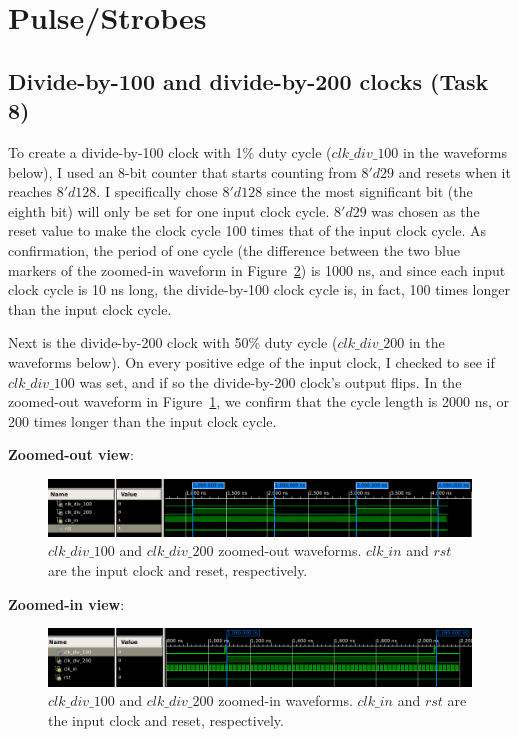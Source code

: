 \documentclass{article}
\begin{document}
\section{Pulse/Strobes}
\subsection{Divide-by-100 and divide-by-200 clocks (Task 8)}
To create a divide-by-100 clock with 1\% duty cycle ($clk\_div\_100$ in the waveforms below), I used an 8-bit counter that starts counting from $8'd29$ and resets when it reaches $8'd128$. I specifically chose $8'd128$ since the most significant bit (the eighth bit) will only be set for one input clock cycle. $8'd29$ was chosen as the reset value to make the clock cycle 100 times that of the input clock cycle. As confirmation, the period of one cycle (the difference between the two blue markers of the zoomed-in waveform in Figure~\ref{fig:clk100_200_zoomedin}) is 1000 ns, and since each input clock cycle is 10 ns long, the divide-by-100 clock cycle is, in fact, 100 times longer than the input clock cycle.

Next is the divide-by-200 clock with 50\% duty cycle ($clk\_div\_200$ in the waveforms below). On every positive edge of the input clock, I checked to see if $clk\_div\_100$ was set, and if so the divide-by-200 clock's output flips. In the zoomed-out waveform in Figure~\ref{fig:clk100_200_zoomedout}, we confirm that the cycle length is 2000 ns, or 200 times longer than the input clock cycle.

\noindent \textbf{Zoomed-out view}:

\begin{figure}[H]
    \centering
    \includegraphics[scale=0.45]{../figs/pulse_1.png}
    \caption{$clk\_div\_100$ and $clk\_div\_200$ zoomed-out waveforms. $clk\_in$ and $rst$ are the input clock and reset, respectively.}
    \label{fig:clk100_200_zoomedout}
\end{figure}


\noindent \textbf{Zoomed-in view}:

\begin{figure}[H]
    \centering
    \includegraphics[scale=0.46]{../figs/pulse_2.png}
    \caption{$clk\_div\_100$ and $clk\_div\_200$ zoomed-in waveforms. $clk\_in$ and $rst$ are the input clock and reset, respectively.}
    \label{fig:clk100_200_zoomedin}
\end{figure}
\end{document}
